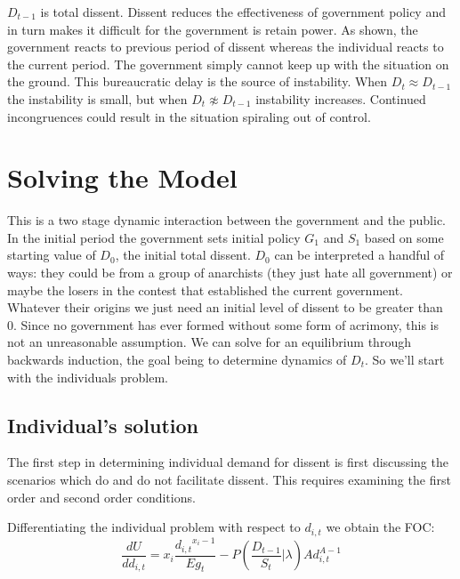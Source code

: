 \documentclass[12pt]{article}
\begin{document}
\begin{spacing}{1.5}
$D_{t-1}$ is total dissent. Dissent reduces the effectiveness of government policy and in turn makes it difficult for the government is retain power. As shown, the government reacts to previous period of dissent whereas the individual reacts to the current period. The government simply cannot keep up with the situation on the ground. This bureaucratic delay is the source of instability. When $D_t \approx D_{t-1}$ the instability is small, but when $D_t \not\approx D_{t-1}$ instability increases. Continued incongruences could result in the situation spiraling out of control. 



\section{Solving the Model}

This is a two stage dynamic interaction between the government and the public. In the initial period the government sets initial policy $G_1$ and $S_1$ based on some starting value of $D_0$, the initial total dissent. $D_0$ can be interpreted a handful of ways: they could be from a group of anarchists (they just hate all government) or maybe the losers in the contest that established the current government. Whatever their origins we just need an initial level of dissent to be greater than 0. Since no government has ever formed without some form of acrimony, this is not an unreasonable assumption. We can solve for an equilibrium through backwards induction, the goal being to determine dynamics of $D_t$. So we'll start with the individuals problem. 

\subsection{Individual's solution}


The first step in determining individual demand for dissent is first discussing the scenarios which do and do not facilitate dissent. This requires examining the first order and second order conditions.  

\noindent Differentiating the individual problem with respect to $d_{i,t}$ we obtain the FOC: 
\begin{equation}
\frac{dU}{dd_{i,t}} = x_i \frac{{d_{i,t}}^{x_i -1}}{E g_t} - P\left(\frac{D_{t-1}}{S_t}\Big|\lambda \right)Ad_{i,t}^{A-1}  
\end{equation}


\end{spacing}
\end{document}
